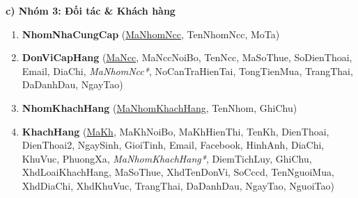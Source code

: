 \documentclass[12pt,a4paper]{report}
\renewcommand{\_}{\textunderscore\allowbreak}
\begin{document}
\begin{sloppypar}
\textbf{c) Nhóm 3: Đối tác \& Khách hàng}
\begin{enumerate}[leftmargin=*, resume, label={\textbf{\arabic*./}}]
    \item \textbf{NhomNhaCungCap} (\underline{MaNhomNcc}, TenNhomNcc, MoTa)
    \item \textbf{DonViCapHang} (\underline{MaNcc}, MaNccNoiBo, TenNcc, MaSoThue, SoDienThoai, Email, DiaChi, \textit{MaNhomNcc*}, NoCanTraHienTai, TongTienMua, TrangThai, DaDanhDau, NgayTao)
    \item \textbf{NhomKhachHang} (\underline{MaNhomKhachHang}, TenNhom, GhiChu)
    \item \textbf{KhachHang} (\underline{MaKh}, MaKhNoiBo, MaKhHienThi, TenKh, DienThoai, DienThoai2, NgaySinh, GioiTinh, Email, Facebook, HinhAnh, DiaChi, KhuVuc, PhuongXa, \textit{MaNhomKhachHang*}, DiemTichLuy, GhiChu, XhdLoaiKhachHang, MaSoThue, XhdTenDonVi, SoCccd, TenNguoiMua, XhdDiaChi, XhdKhuVuc, TrangThai, DaDanhDau, NgayTao, NguoiTao)
\end{enumerate}


\end{sloppypar}
\end{document}
